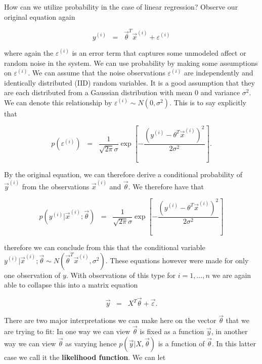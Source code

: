 \documentclass{article}
\begin{document}
\noindent How can we utilize probability in the case of linear regression?  Observe our original equation again

\begin{equation*}
y^{(i)} \;\; =\;\; \vec{\theta}^T \vec{x}^{(i)} + \varepsilon^{(i)}
\end{equation*}

\noindent where again the $\varepsilon^{(i)}$ is an error term that captures some unmodeled affect or random noise in the system.  We can use probability by making some assumptions on $\varepsilon^{(i)}$.  We can assume that the noise observations $\varepsilon^{(i)}$ are independently and identically distributed (IID) random variables.  It is a good assumption that they are each distributed from a Gaussian distribution with mean $0$ and variance $\sigma^2$.  We can denote this relationship by $\varepsilon^{(i)} \sim N(0, \sigma^2)$.  This is to say explicitly that 

\begin{equation*}
p\left (\varepsilon^{(i)} \right ) \;\; =\;\; \frac{1}{\sqrt{2\pi} \sigma} \exp \left [ - \frac{(y^{(i)} - \theta^T \vec{x}^{(i)})^2}{2\sigma^2} \right ].
\end{equation*}

\noindent By the original equation, we can therefore derive a conditional probability of $\vec{y}^{(i)}$ from the observations $\vec{x}^{(i)}$ and $\vec{\theta}$.  We therefore have that 

\begin{equation*}
p(y^{(i)}|\vec{x}^{(i)}; \vec{\theta}) \;\; =\;\; \frac{1}{\sqrt{2\pi} \sigma} \exp \left [ - \frac{(y^{(i)} - \theta^T \vec{x}^{(i)})^2}{2\sigma^2} \right ]
\end{equation*}

\noindent therefore we can conclude from this that the conditional variable $y^{(i)}|\vec{x}^{(i)}; \vec{\theta} \sim N(\vec{\theta}^T\vec{x}^{(i)}, \sigma^2)$.  These equations however were made for only one observation of $y$.  With observations of this type for $i = 1, \ldots, n$ we are again able to collapse this into a matrix equation

\begin{equation*}
\vec{y} \;\; =\;\; X^T \vec{\theta} + \vec{\varepsilon}.
\end{equation*}

\noindent There are two major interpretations we can make here on the vector $\vec{\theta}$ that we are trying to fit: In one way we can view $\vec{\theta}$ is fixed as a function $\vec{y}$, in another way we can view $\vec{\theta}$ as varying hence $p(\vec{y}|X, \vec{\theta})$ is a function of $\vec{\theta}$.  In this latter case we call it the \textbf{likelihood function}.  We can let 
\end{document}
